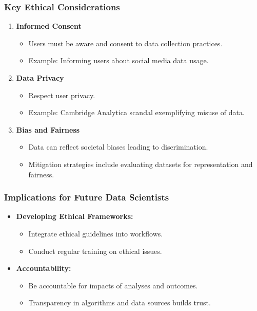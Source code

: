 \documentclass[aspectratio=169]{beamer}
\begin{document}
\begin{frame}[fragile]
    \frametitle{Key Ethical Considerations}
    \begin{enumerate}
        \item \textbf{Informed Consent}
            \begin{itemize}
                \item Users must be aware and consent to data collection practices.
                \item Example: Informing users about social media data usage.
            \end{itemize}
            
        \item \textbf{Data Privacy}
            \begin{itemize}
                \item Respect user privacy.
                \item Example: Cambridge Analytica scandal exemplifying misuse of data.
            \end{itemize}
        
        \item \textbf{Bias and Fairness}
            \begin{itemize}
                \item Data can reflect societal biases leading to discrimination.
                \item Mitigation strategies include evaluating datasets for representation and fairness.
            \end{itemize}
    \end{enumerate}
\end{frame}

\begin{frame}[fragile]
    \frametitle{Implications for Future Data Scientists}
    \begin{itemize}
        \item \textbf{Developing Ethical Frameworks:}
            \begin{itemize}
                \item Integrate ethical guidelines into workflows.
                \item Conduct regular training on ethical issues.
            \end{itemize}
            
        \item \textbf{Accountability:}
            \begin{itemize}
                \item Be accountable for impacts of analyses and outcomes.
                \item Transparency in algorithms and data sources builds trust.
            \end{itemize}
    \end{itemize}
\end{frame}
\end{document}
